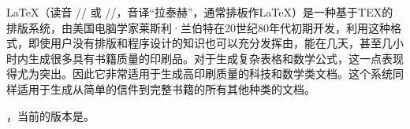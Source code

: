 
LaTeX（读音 // 或 //，音译“拉泰赫”，通常排板作\LaTeX）是一种基于TEX的排版系统，由美国电脑学家莱斯利·兰伯特在20世纪80年代初期开发，利用这种格式，即使用户没有排版和程序设计的知识也可以充分发挥由，能在几天，甚至几小时内生成很多具有书籍质量的印刷品。对于生成复杂表格和数学公式，这一点表现得尤为突出。因此它非常适用于生成高印刷质量的科技和数学类文档。这个系统同样适用于生成从简单的信件到完整书籍的所有其他种类的文档。

，当前的版本是\LaTeXe。

\newcommand{\guanjianci}{\LaTeX}
